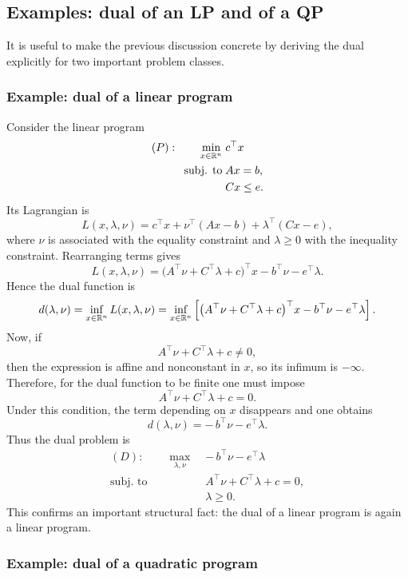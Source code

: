 \subsection{Examples: dual of an LP and of a QP}

It is useful to make the previous discussion concrete by deriving the dual explicitly for two
important problem classes.

\subsubsection{Example: dual of a linear program}

Consider the linear program
\[
\begin{aligned}
(P):\qquad
\min_{x\in\mathbb{R}^n}\;& c^\top x\\
\text{subj. to}\;& Ax=b,\\
& Cx\le e.
\end{aligned}
\]
Its Lagrangian is
\[
L(x,\lambda,\nu)
=
c^\top x+\nu^\top(Ax-b)+\lambda^\top(Cx-e),
\]
where \(\nu\) is associated with the equality constraint and \(\lambda\ge 0\) with the inequality
constraint. Rearranging terms gives
\[
L(x,\lambda,\nu)
=
\bigl(A^\top \nu + C^\top \lambda + c\bigr)^\top x
-
b^\top \nu
-
e^\top \lambda.
\]
Hence the dual function is
\[
d(\lambda,\nu)
=
\inf_{x\in\mathbb{R}^n} L(x,\lambda,\nu)
=
\inf_{x\in\mathbb{R}^n}
\left[
\bigl(A^\top \nu + C^\top \lambda + c\bigr)^\top x
-
b^\top \nu
-
e^\top \lambda
\right].
\]
Now, if
\[
A^\top \nu + C^\top \lambda + c \neq 0,
\]
then the expression is affine and nonconstant in \(x\), so its infimum is \(-\infty\). Therefore,
for the dual function to be finite one must impose
\[
A^\top \nu + C^\top \lambda + c = 0.
\]
Under this condition, the term depending on \(x\) disappears and one obtains
\[
d(\lambda,\nu) = -\,b^\top \nu - e^\top \lambda.
\]
Thus the dual problem is
\[
\begin{aligned}
(D):\qquad
\max_{\lambda,\nu}\;& -\,b^\top \nu - e^\top \lambda\\
\text{subj. to}\;& A^\top \nu + C^\top \lambda + c = 0,\\
& \lambda \ge 0.
\end{aligned}
\]
This confirms an important structural fact: the dual of a linear program is again a linear
program.

\subsubsection{Example: dual of a quadratic program}

